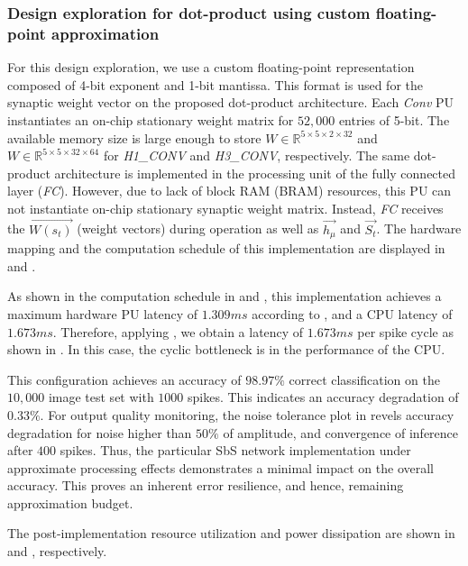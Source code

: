 \subsubsection{Design exploration for dot-product using custom floating-point approximation}
For this design exploration, we use a custom floating-point representation composed of 4-bit exponent and 1-bit mantissa. This format is used for the synaptic weight vector on the proposed dot-product architecture. Each \emph{Conv} PU instantiates an on-chip stationary weight matrix for $52,000$ entries of 5-bit. The available memory size is large enough to store $W\in\mathbb{R}^{5\times 5\times 2\times 32}$ and $W\in\mathbb{R}^{5\times 5\times 32\times 64}$ for \emph{H1\_CONV} and \emph{H3\_CONV}, respectively. The same dot-product architecture is implemented in the processing unit of the fully connected layer (\emph{FC}). However, due to lack of block RAM (BRAM) resources, this PU can not instantiate on-chip stationary synaptic weight matrix. Instead, \emph{FC} receives the $\vec{W(s_t)}$ (weight vectors) during operation as well as $\vec{h_\mu}$ and $\vec{S_t}$. The hardware mapping and the computation schedule of this implementation are displayed in  and .

As shown in the computation schedule in  and , this implementation achieves a maximum hardware PU latency of $1.309 ms$ according to , and a CPU latency of $1.673 ms$. Therefore, applying , we obtain a latency of $1.673 ms$ per spike cycle as shown in . In this case, the cyclic bottleneck is in the performance of the CPU.

This configuration achieves an accuracy of $98.97\%$ correct classification on the $10,000$ image test set with $1000$ spikes. This indicates an accuracy degradation of $0.33\%$. For output quality monitoring, the noise tolerance plot in  revels accuracy degradation for noise higher than $50\%$ of amplitude, and convergence of inference after $400$ spikes. Thus, the particular SbS network implementation under approximate processing effects demonstrates a minimal impact on the overall accuracy. This proves an inherent error resilience, and hence, remaining approximation budget.

The post-implementation resource utilization and power dissipation are shown in  and , respectively.

